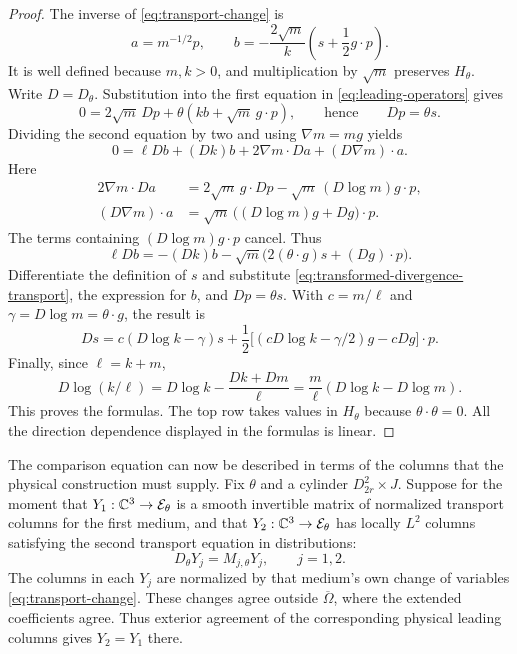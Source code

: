 \begin{proof}
The inverse of \eqref{eq:transport-change} is
\[
 a=m^{-1/2}p,
 \qquad
 b=-\frac{2\sqrt m}{k}\left(s+\frac12g\cdot p\right).
\]
It is well defined because $m,k>0$, and multiplication by $\sqrt m$
preserves $H_\theta$. Write $D=D_\theta$. Substitution into the first
equation in \eqref{eq:leading-operators} gives
\[
 0=2\sqrt m\,Dp+\theta(kb+\sqrt m\,g\cdot p),
 \qquad\text{hence}\qquad Dp=\theta s.
\]
Dividing the second equation by two and using
$\nabla m=mg$ yields
\[
 0=\ell Db+(Dk)b+2\nabla m\cdot Da+(D\nabla m)\cdot a.
\]
Here
\[
 \begin{aligned}
 2\nabla m\cdot Da
   &=2\sqrt m\,g\cdot Dp
     -\sqrt m\,(D\log m)g\cdot p,\\
 (D\nabla m)\cdot a
   &=\sqrt m\,\bigl((D\log m)g+Dg\bigr)\cdot p.
 \end{aligned}
\]
The terms containing $(D\log m)g\cdot p$ cancel. Thus
\begin{equation}\label{eq:transformed-divergence-transport}
 \ell Db=-(Dk)b
   -\sqrt m\bigl(2(\theta\cdot g)s+(Dg)\cdot p\bigr).
\end{equation}
Differentiate the definition of $s$ and substitute
\eqref{eq:transformed-divergence-transport}, the expression for $b$,
and $Dp=\theta s$. With $c=m/\ell$ and $\gamma=D\log m=\theta\cdot g$,
the result is
\[
 Ds=c(D\log k-\gamma)s
   +\frac12\bigl[(cD\log k-\gamma/2)g-cDg\bigr]\cdot p.
\]
Finally, since $\ell=k+m$,
\[
 D\log(k/\ell)
 =D\log k-\frac{Dk+Dm}{\ell}
 =\frac m\ell(D\log k-D\log m).
\]
This proves the formulas. The top row takes values in $H_\theta$
because $\theta\cdot\theta=0$. All the direction dependence displayed
in the formulas is linear.
\end{proof}

The comparison equation can now be described in terms of the columns
that the physical construction must supply. Fix $\theta$ and a cylinder
$D_{2r}^2\times J$. Suppose for the moment that
$Y_1:\mathbb C^3\to\mathcal E_\theta$ is a smooth invertible matrix of normalized
transport columns for the first medium, and that
$Y_2:\mathbb C^3\to\mathcal E_\theta$ has locally $L^2$ columns satisfying the
second transport equation in distributions:
\[
 D_\theta Y_j=M_{j,\theta}Y_j,\qquad j=1,2.
\]
The columns in each $Y_j$ are normalized by that medium's own change
of variables \eqref{eq:transport-change}. These changes agree outside
$\overline\Omega$, where the extended coefficients agree. Thus exterior
agreement of the corresponding physical leading columns gives
$Y_2=Y_1$ there.

